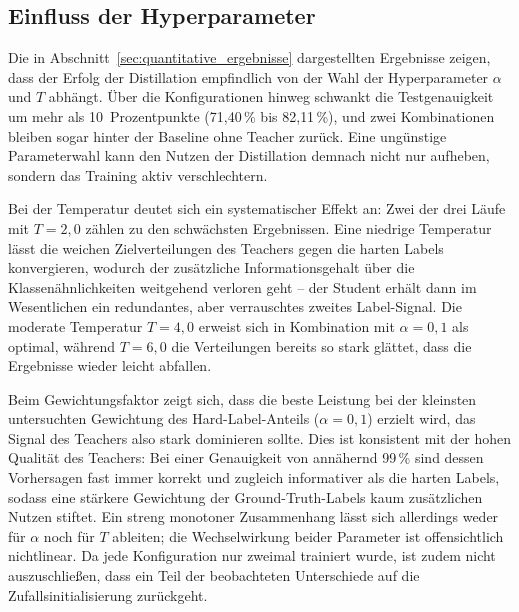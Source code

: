 \subsection{Einfluss der Hyperparameter}
\label{sec:diskussion_hyperparameter}
 
Die in Abschnitt~\ref{sec:quantitative_ergebnisse} dargestellten Ergebnisse zeigen, dass der Erfolg der Distillation
empfindlich von der Wahl der Hyperparameter $\alpha$ und $T$ abhängt. Über die Konfigurationen hinweg schwankt die
Testgenauigkeit um mehr als 10~Prozentpunkte (71{,}40\,\% bis 82{,}11\,\%), und zwei Kombinationen bleiben sogar
hinter der Baseline ohne Teacher zurück. Eine ungünstige Parameterwahl kann den Nutzen der Distillation demnach nicht
nur aufheben, sondern das Training aktiv verschlechtern.
 
Bei der Temperatur deutet sich ein systematischer Effekt an: Zwei der drei Läufe mit $T = 2{,}0$ zählen zu den
schwächsten Ergebnissen. Eine niedrige Temperatur lässt die weichen Zielverteilungen des Teachers gegen die harten
Labels konvergieren, wodurch der zusätzliche Informationsgehalt über die Klassenähnlichkeiten weitgehend verloren
geht -- der Student erhält dann im Wesentlichen ein redundantes, aber verrauschtes zweites Label-Signal. Die moderate
Temperatur $T = 4{,}0$ erweist sich in Kombination mit $\alpha = 0{,}1$ als optimal, während $T = 6{,}0$ die
Verteilungen bereits so stark glättet, dass die Ergebnisse wieder leicht abfallen.
 
Beim Gewichtungsfaktor zeigt sich, dass die beste Leistung bei der kleinsten untersuchten Gewichtung des
Hard-Label-Anteils ($\alpha = 0{,}1$) erzielt wird, das Signal des Teachers also stark dominieren sollte. Dies ist
konsistent mit der hohen Qualität des Teachers: Bei einer Genauigkeit von annähernd 99\,\% sind dessen Vorhersagen
fast immer korrekt und zugleich informativer als die harten Labels, sodass eine stärkere Gewichtung der
Ground-Truth-Labels kaum zusätzlichen Nutzen stiftet. Ein streng monotoner Zusammenhang lässt sich allerdings weder
für $\alpha$ noch für $T$ ableiten; die Wechselwirkung beider Parameter ist offensichtlich nichtlinear. Da jede
Konfiguration nur zweimal trainiert wurde, ist zudem nicht auszuschließen, dass ein Teil der beobachteten Unterschiede
auf die Zufallsinitialisierung zurückgeht.
